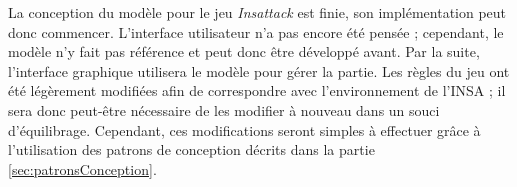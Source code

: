 La conception du modèle pour le jeu \emph{Insattack} est finie, son implémentation peut donc commencer.
L'interface utilisateur n'a pas encore été pensée ; cependant, le modèle n'y fait pas référence et peut donc être développé avant.
Par la suite, l'interface graphique utilisera le modèle pour gérer la partie.
\medbreak
Les règles du jeu ont été légèrement modifiées afin de correspondre avec l'environnement de l'INSA ; il sera donc peut-être nécessaire de les modifier à nouveau dans un souci d'équilibrage.
Cependant, ces modifications seront simples à effectuer grâce à l'utilisation des patrons de  conception décrits dans la partie \ref{sec:patronsConception}.